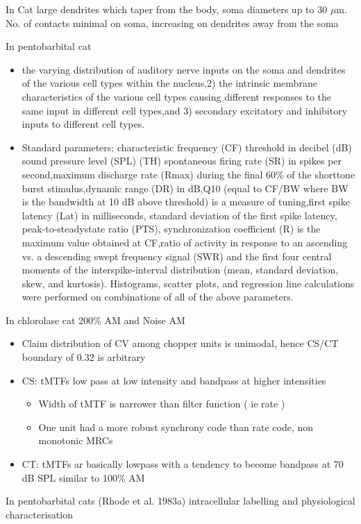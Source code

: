 \documentclass[10pt,a4paper]{article}
\newcommand{\um}{$\mu$m}
\begin{document}
In Cat \citep{Cant:1981} large dendrites which taper from the body, soma
diameters up to 30 \um.  No. of contacts minimal on soma, increasing on dendrites
away from the soma

In pentobarbital cat \citep{RhodeSmith:1986}


\begin{itemize}
\item the varying distribution of auditory nerve inputs on the soma and
  dendrites of the various cell types within the nucleus,2) the intrinsic
  membrane characteristics of the various cell types causing different responses
  to the same input in different cell types,and 3) secondary excitatory and
  inhibitory inputs to different cell types.
\item Standard parameters: characteristic frequency (CF) threshold in decibel
  (dB) sound pressure level (SPL) (TH) spontaneous firing rate (SR) in spikes
  per second,maximum discharge rate (Rmax) during the final 60\% of the
  shorttone burst stimulus,dynamic range (DR) in dB,Q10 (equal to CF/BW where BW
  is the bandwidth at 10 dB above threshold) is a measure of tuning,first spike
  latency (Lat) in milliseconds, standard deviation of the first spike latency,
  peak-to-steadystate ratio (PTS), synchronization coefficient (R) is the
  maximum value obtained at CF,ratio of activity in response to an ascending
  vs. a descending swept frequency signal (SWR) and the first four central
  moments of the interspike-interval distribution (mean, standard deviation,
  skew, and kurtosis). Histograms, scatter plots, and regression line
  calculations were performed on combinations of all of the above parameters.
\end{itemize}
In chlorolase cat \citep{Rhode:1994} 200\% AM and Noise AM


\begin{itemize}
\item Claim distribution of CV among chopper units is unimodal, hence CS/CT
  boundary of 0.32 is arbitrary
\item CS: tMTFs low pass at low intensity and bandpass at higher intensities

  \begin{itemize}
  \item Width of tMTF is narrower than filter function ( ie rate )
  \item One unit had a more robust synchrony code than rate code, non monotonic
    MRCs
  \end{itemize}
\item CT: tMTFs ar basically lowpass with a tendency to become bandpass at 70 dB
  SPL similar to 100\% AM \citep{RhodeGreenberg:1994a}
\end{itemize}
In pentobarbital cats (Rhode et al. 1983a) intracellular labelling and
physiological characterisation
\end{document}
